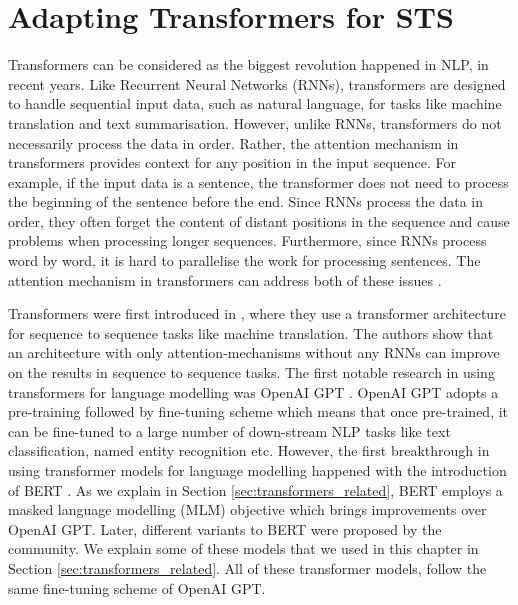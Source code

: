 \chapter{\label{cha:sts_transformers}Adapting Transformers for STS}

Transformers can be considered as the biggest revolution happened in NLP, in recent years. Like Recurrent Neural Networks (RNNs), transformers are designed to handle sequential input data, such as natural language, for tasks like machine translation and text summarisation. However, unlike RNNs, transformers do not necessarily process the data in order. Rather, the attention mechanism in transformers provides context for any position in the input sequence. For example, if the input data is a sentence, the transformer does not need to process the beginning of the sentence before the end. Since RNNs process the data in order, they often forget the content of distant positions in the sequence and cause problems when processing longer sequences. Furthermore, since RNNs process word by word, it is hard to parallelise the work for processing sentences. The attention mechanism in transformers can address both of these issues \autocite{10.5555/3295222.3295349}.


Transformers were first introduced in \autocite{10.5555/3295222.3295349}, where they use a transformer architecture for sequence to sequence tasks like machine translation. The authors show that an architecture with only attention-mechanisms without any RNNs can improve on the results in sequence to sequence tasks. The first notable research in using transformers for language modelling was OpenAI GPT \autocite{radford2018improving}. OpenAI GPT adopts a pre-training followed by fine-tuning scheme which means that once pre-trained, it can be fine-tuned to a large number of down-stream NLP tasks like text classification, named entity recognition etc. However, the first breakthrough in using transformer models for language modelling happened with the introduction of BERT \autocite{devlin-etal-2019-bert}. As we explain in Section \ref{sec:transformers_related}, BERT employs a masked language modelling (MLM) objective which brings improvements over OpenAI GPT. Later, different variants to BERT were proposed by the community. We explain some of these models that we used in this chapter in Section \ref{sec:transformers_related}. All of these transformer models, follow the same fine-tuning scheme of OpenAI GPT.


